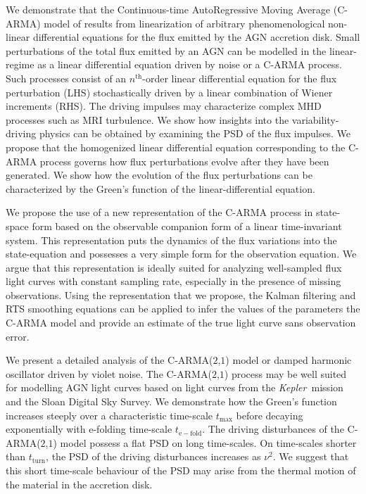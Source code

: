 \documentclass[a4paper,fleqn,usenatbib]{mnras}
\newcommand{\Kepler}{\textit{Kepler~}}
\begin{document}
We demonstrate that the Continuous-time AutoRegressive Moving Average (C-ARMA) model of \citet{Kelly14} results from linearization of arbitrary phenomenological non-linear differential equations for the flux emitted by the AGN accretion disk. Small perturbations of the total flux emitted by an AGN can be modelled in the linear-regime as a linear differential equation driven by noise or a C-ARMA process. Such processes consist of an $n^{\mathrm{th}}$-order linear differential equation for the flux perturbation (LHS) stochastically driven by a linear combination of Wiener increments (RHS). The driving impulses may characterize complex MHD processes such as MRI turbulence. We show how insights into the variability-driving physics can be obtained by examining the PSD of the flux impulses. We propose that the homogenized linear differential equation corresponding to the C-ARMA process governs how flux perturbations evolve after they have been generated. We show how the evolution of the flux perturbations can be characterized by the Green's function of the linear-differential equation.

We propose the use of a new representation of the C-ARMA process in state-space form based on the observable companion form of a linear time-invariant system. This representation puts the dynamics of the flux variations into the state-equation and possesses a very simple form for the observation equation. We argue that this representation is ideally suited for analyzing well-sampled flux light curves with constant sampling rate, especially in the presence of missing observations. Using the representation that we propose, the Kalman filtering and RTS smoothing equations can be applied to infer the values of the parameters the C-ARMA model and provide an estimate of the true light curve sans observation error.

We present a detailed analysis of the C-ARMA($2$,$1$) model or damped harmonic oscillator driven by violet noise. The C-ARMA($2$,$1$) process may be well suited for modelling AGN light curves based on light curves from the \Kepler mission and the Sloan Digital Sky Survey. We demonstrate how the Green's function increases steeply over a characteristic time-scale $t_{\mathrm{max}}$ before decaying exponentially with e-folding time-scale $t_{\mathrm{e-fold}}$. The driving disturbances of the C-ARMA($2$,$1$) model possess a flat PSD on long time-scales. On time-scales shorter than $t_{\mathrm{turn}}$, the PSD of the driving disturbances increases as $\nu^{2}$. We suggest that this short time-scale behaviour of the PSD may arise from the thermal motion of the material in the accretion disk.
\end{document}
